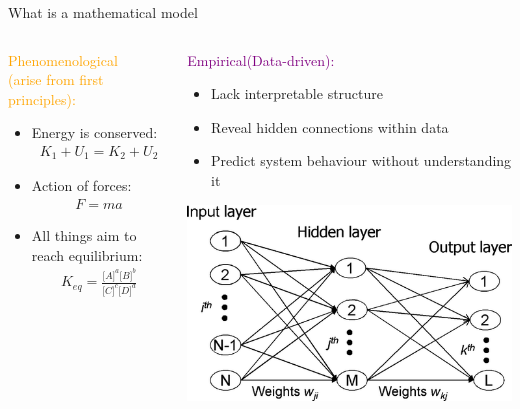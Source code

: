 \documentclass[mathserif,11pt]{beamer}
\begin{document}
\begin{frame}{What is a mathematical model}
\centering
\begin{columns}
\begin{column}{0.5\textwidth}
\centering
\textcolor{orange}{Phenomenological \\(arise from first principles):}\\
\begin{itemize}
	\item Energy is conserved:
 \begin{align*}
		K_1 + U_1 = K_2 + U_2
	\end{align*}
	\item Action of  forces:
		\begin{align*}
		F = m a
	\end{align*}
	\item All things aim to reach equilibrium:
	\begin{align*}
			K_{eq} = \frac{\lbrack A\rbrack ^a \lbrack B\rbrack^b}{\lbrack C\rbrack^c \lbrack D\rbrack^d}
	\end{align*}
\end{itemize}
\end{column}
\begin{column}{0.5\textwidth}
\centering
\textcolor{purple}{Empirical(Data-driven):}\\
\begin{itemize}
	\item Lack interpretable structure
	\item Reveal hidden connections within data
	\item Predict system behaviour without understanding it
\end{itemize}
\centering
 \includegraphics[width=\textwidth]{Figures/neunet.png}\\
\end{column}
\end{columns}
\end{frame}
\end{document}
